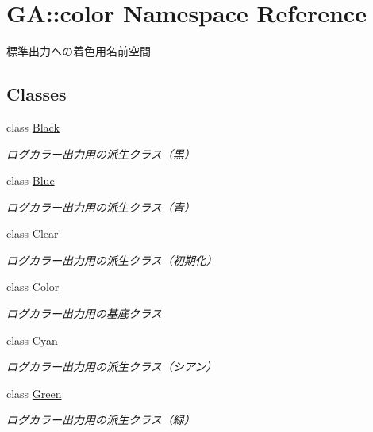 \hypertarget{namespace_g_a_1_1color}{}\section{GA\+::color Namespace Reference}
\label{namespace_g_a_1_1color}


標準出力への着色用名前空間  


\subsection*{Classes}
\begin{DoxyCompactItemize}
\item 
class \mbox{\hyperlink{class_g_a_1_1color_1_1_black}{Black}}
\begin{DoxyCompactList}\small\item\em ログカラー出力用の派生クラス（黒） \end{DoxyCompactList}\item 
class \mbox{\hyperlink{class_g_a_1_1color_1_1_blue}{Blue}}
\begin{DoxyCompactList}\small\item\em ログカラー出力用の派生クラス（青） \end{DoxyCompactList}\item 
class \mbox{\hyperlink{class_g_a_1_1color_1_1_clear}{Clear}}
\begin{DoxyCompactList}\small\item\em ログカラー出力用の派生クラス（初期化） \end{DoxyCompactList}\item 
class \mbox{\hyperlink{class_g_a_1_1color_1_1_color}{Color}}
\begin{DoxyCompactList}\small\item\em ログカラー出力用の基底クラス \end{DoxyCompactList}\item 
class \mbox{\hyperlink{class_g_a_1_1color_1_1_cyan}{Cyan}}
\begin{DoxyCompactList}\small\item\em ログカラー出力用の派生クラス（シアン） \end{DoxyCompactList}\item 
class \mbox{\hyperlink{class_g_a_1_1color_1_1_green}{Green}}
\begin{DoxyCompactList}\small\item\em ログカラー出力用の派生クラス（緑） \end{DoxyCompactList}\item 

\end{DoxyCompactItemize}
